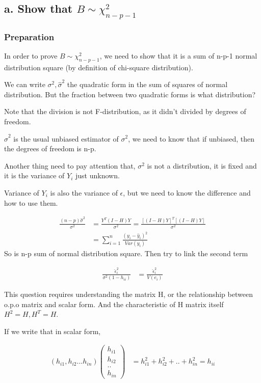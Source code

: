 \documentclass[11pt]{article} %
\begin{document}
\subsection{a. Show that $B \sim \chi^2_{n-p-1}$}

\subsubsection{Preparation}
In order to prove $B \sim \chi^2_{n-p-1}$, we need to show that it is a sum of n-p-1 normal distribution square (by definition of chi-square distribution). 

We can write $\sigma^2, \hat{\sigma}^2$ the quadratic form in the sum of squares of normal distribution. But the fraction between two quadratic forms is what distribution? 

Note that the division is not F-distribution, as it didn't divided by degrees of freedom. 

$\hat{\sigma}^2$ is the usual unbiased estimator of $\sigma^2$, we need to know that if unbiased, then the degrees of freedom is n-p.

Another thing need to pay attention that,  $\sigma^2$ is not a distribution, it is fixed and it is the variance of $Y_i$ just unknown. 

Variance of $Y_i$ is also the variance of $\epsilon$, but we need to know the difference and how to use them.

\begin{align*}
	\frac{(n-p)\hat{\sigma}^2 }{\sigma^2} &= \frac{Y^T (I-H) Y}{\sigma^2} = \frac{[(I-H)Y]^T [(I-H)Y]}{\sigma^2} \\
	&= \sum_{i=1}^n  \frac{(y_i-\hat{y}_i)^2}{Var(y_i)}
\end{align*}
So  is n-p sum of normal distribution square. Then try to link the second term

\begin{align*}
	\frac{\hat{\epsilon}_i^2}{\sigma^2(1-h_{ii})}&= \frac{\hat{\epsilon}_i^2}{V(e_i)} 
\end{align*}

This question requires understanding the matrix H, or the relationship between o.p.o matrix and scalar form. And the characteristic of H matrix itself $H^2 = H, H^T = H$. 

If we write that in scalar form, 

\begin{align*}
	(h_{i1} , h_{i2} ... h_{in}) \begin{pmatrix*} 
		h_{i1} \\
		h_{i2}\\
		..\\
		h_{in}
		\end{pmatrix*}
		  &= h_{i1}^2 + h_{i2}^2 + .. + h_{in}^2 = h_{ii}
\end{align*} 
\end{document}
